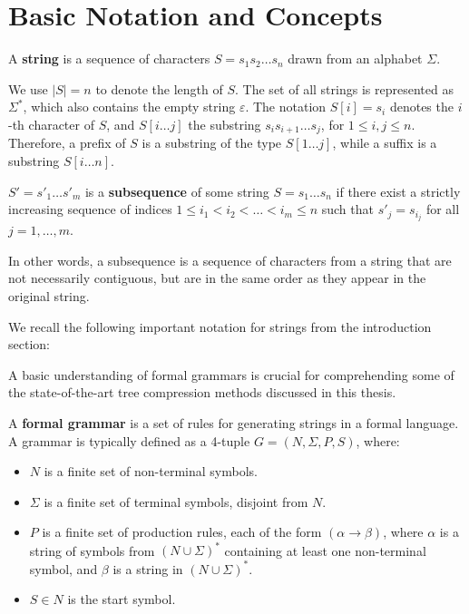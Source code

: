 \section{Basic Notation and Concepts} \label{sec:notation}


\begin{definition}[String]\label{def:string}
    A \textbf{string} is a sequence of characters $S = s_1s_2\ldots s_n$ drawn from an alphabet $\Sigma$.
\end{definition}
We use $|S| = n$ to denote the length of $S$.
The set of all strings is represented as $\Sigma^*$, which also contains the empty string $\varepsilon$.\newline
The notation $S[i] = s_i$ denotes the $i$-th character of $S$, and $S[i\dots j]$ the substring $s_is_{i+1}\ldots s_j$, for $1 \leq i,j \leq n$.
Therefore, a prefix of $S$ is a substring of the type $S[1\dots j]$, while a suffix is a substring $S[i \dots n]$.

\begin{definition}[Subsequence]
    $S' = s'_1\ldots s'_m$ is a \textbf{subsequence} of some string $S = s_1\ldots s_n$ if there exist a strictly increasing sequence of indices $1 \le i_1 < i_2 < \ldots < i_m \le n$ such that $s'_j = s_{i_j}$ for all $j = 1,\ldots, m$.    
\end{definition}
In other words, a subsequence is a sequence of characters from a string that are not necessarily contiguous, but are in the same order as they appear in the original string.

We recall the following important notation for strings from the introduction section: 
\vspace{-1em}
\setsubseqdef*

A basic understanding of formal grammars is crucial for comprehending some of the state-of-the-art tree compression methods discussed in this thesis.
\begin{definition}[Grammar]
    A \textbf{formal grammar} is a set of rules for generating strings in a formal language. A grammar is typically defined as a 4-tuple $G = (N, \Sigma, P, S)$, where:
    \begin{itemize}
        \item $N$ is a finite set of non-terminal symbols.
        \item $\Sigma$ is a finite set of terminal symbols, disjoint from $N$.
        \item $P$ is a finite set of production rules, each of the form $(\alpha \rightarrow \beta)$, where $\alpha$ is a string of symbols from $(N \cup \Sigma)^*$ containing at least one non-terminal symbol, and $\beta$ is a string in $(N \cup \Sigma)^*$.
        \item $S \in N$ is the start symbol.
    \end{itemize}
\end{definition}

